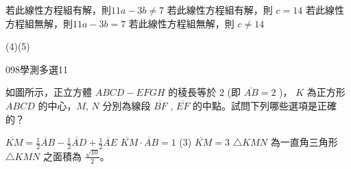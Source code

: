 \begin{QUESTIONS}
\begin{QUESTION}
\begin{QBODY}
\begin{QOPS}
				\QOP 若此線性方程組有解，則$11a-3b \neq 7$ 
				\QOP 若此線性方程組有解，則 $c=14$  
				\QOP 若此線性方程組無解，則$11a-3b=7$ 
				\QOP 若此線性方程組無解，則 $c\neq 14$
			\end{QOPS}
        \end{QBODY}
        \begin{QFROMS}
        \end{QFROMS}
        \begin{QTAGS}\end{QTAGS}
        \begin{QANS}
            (4)(5)
        \end{QANS}
        \begin{QSOLLIST}
        \end{QSOLLIST}
        \begin{QEMPTYSPACE}
        \end{QEMPTYSPACE}
    \end{QUESTION}
    \begin{QUESTION}
        \begin{ExamInfo}{098}{學測}{多選}{11}
        \end{ExamInfo}
        \begin{ExamAnsRateInfo}{38}{70}{32}{12}
        \end{ExamAnsRateInfo}
        \begin{QBODY}
			如圖所示，正立方體 $ABCD - EFGH$ 的稜長等於 2 (即 $\overline{AB} = 2$ )， $K$ 為正方形 $ABCD $ 的中心，$M$, $N$ 分別為線段 $\overline{BF}$ ,  $\overline{EF}$ 的中點。試問下列哪些選項是正確的？ 
			\begin{QOPS} 
				\QOP  $\lvec{KM} = \frac{1}{2} \lvec{AB} - \frac{1}{2} \lvec{AD} + \frac{1}{2} \lvec{AE}$ 
				\QOP $\lvec{KM} \cdot \lvec{AB}=1$ (3) \quad $\lvec{KM}=3$ 
				\QOP  $\triangle KMN$ 為一直角三角形 
				\QOP $\triangle KMN$ 之面積為 $\frac{\sqrt{10}}{2}$。
			\end{QOPS}
			

\end{QBODY}
\end{QUESTION}
\end{QUESTIONS}
